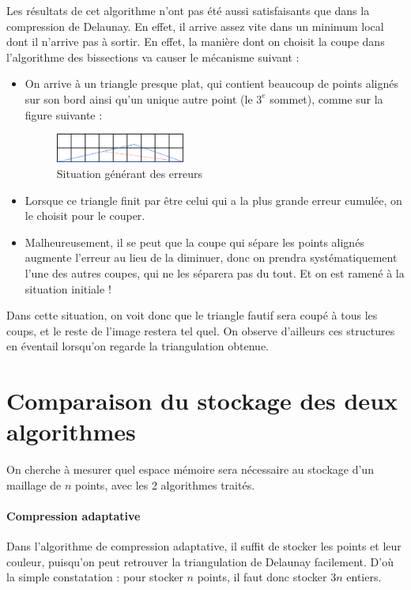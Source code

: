 \documentclass{report}
\begin{document}
Les résultats de cet algorithme n'ont pas été aussi satisfaisants que dans la compression de Delaunay. En effet, il arrive assez vite dans un minimum local dont il n'arrive pas à sortir. En effet, la manière dont on choisit la coupe dans l'algorithme des bissections va causer le mécanisme suivant :
\begin{itemize}
	\item On arrive à un triangle presque plat, qui contient beaucoup de points alignés sur son bord ainsi qu'un unique autre point (le $3^e$ sommet), comme sur la figure suivante :

\begin{figure}[ht]
\centering
\includegraphics[width=0.4\textwidth]{badTriangle.png}
\caption{Situation générant des erreurs}
\end{figure}
	
    \item Lorsque ce triangle finit par être celui qui a la plus grande erreur cumulée, on le choisit pour le couper.
	\item Malheureusement, il se peut que la coupe qui sépare les points alignés augmente l'erreur au lieu de la diminuer, donc on prendra systématiquement l'une des autres coupes, qui ne les séparera pas du tout. Et on est ramené à la situation initiale !
\end{itemize}

Dans cette situation, on voit donc que le triangle fautif sera coupé à tous les coups, et le reste de l'image restera tel quel. On observe d'ailleurs ces structures en éventail lorsqu'on regarde la triangulation obtenue. 

\section{Comparaison du stockage des deux algorithmes}

On cherche à mesurer quel espace mémoire sera nécessaire au stockage d'un maillage de $n$ points, avec les 2 algorithmes traités.

\paragraph{Compression adaptative}

Dans l'algorithme de compression adaptative, il suffit de stocker les points et leur couleur, puisqu'on peut retrouver la triangulation de Delaunay facilement. D'où la simple constatation : pour stocker $n$ points, il faut donc stocker $3n$ entiers.
\end{document}
